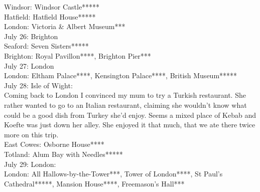 Windsor: Windsor Castle*****\\
Hatfield: Hatfield House*****\\
London: Victoria \& Albert Museum***\\
 
July 26: Brighton\\
Seaford: Seven Sisters*****\\
Brighton: Royal Pavillon****, Brighton Pier***\\

July 27: London\\
London: Eltham Palace****, Kensington Palace****, British Museum*****\\

July 28: Isle of Wight:\\

Coming back to London I convinced my mum to try a Turkish restaurant. She rather wanted to go to an Italian restaurant, claiming she wouldn't know what could be a good dish from Turkey she'd enjoy. Seems a mixed place of Kebab and Koefte was just down her alley. She enjoyed it that much, that we ate there twice more on this trip.\\

East Cowes: Osborne House****\\
Totland: Alum Bay with Needles*****\\

July 29: London:\\
London: All Hallows-by-the-Tower***, Tower of London****, St Paul's Cathedral*****, Mansion House****, Freemason's Hall***\\

